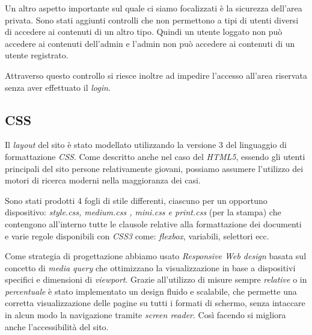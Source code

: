 Un altro aspetto importante sul quale ci siamo focalizzati è la sicurezza dell'area privata. Sono stati aggiunti controlli che non permettono a tipi di utenti diversi di accedere ai contenuti di un altro tipo. Quindi un utente loggato non può accedere ai contenuti dell’admin e l’admin non può accedere ai contenuti di un utente registrato.

Attraverso questo controllo si riesce inoltre ad impedire l’accesso all’area riservata senza aver effettuato il \textit{login}.

\subsection{CSS}
Il \textit{layout} del sito è stato modellato utilizzando la versione 3 del linguaggio di formattazione \textit{CSS}. Come descritto anche nel caso del \textit{HTML5}, essendo gli utenti principali del sito persone relativamente giovani, possiamo assumere l’utilizzo dei motori di ricerca moderni nella maggioranza dei casi.

Sono stati prodotti 4 fogli di stile differenti, ciascuno per un opportuno dispositivo: \textit{style.css, medium.css , mini.css e print.css} (per la stampa) che contengono all'interno tutte le clausole relative alla formattazione dei documenti e varie regole disponibili con \textit{CSS3} come: \textit{flexbox}, variabili, selettori ecc.

Come strategia di progettazione abbiamo usato \textit{Responsive Web design} basata sul concetto di \textit{media query} che ottimizzano la visualizzazione in base a dispositivi specifici e dimensioni di \textit{viewport}. Grazie all’utilizzo di misure sempre \textit{relative} o in \textit{percentuale} è stato implementato un design fluido e scalabile, che permette una corretta visualizzazione delle pagine su tutti i formati di schermo, senza intaccare in alcun modo la navigazione tramite \textit{screen reader}. Così facendo si migliora anche l’accessibilità del sito.

